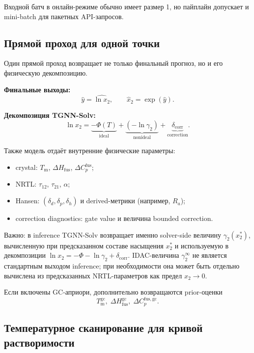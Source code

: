 \documentclass[11pt]{article}
\begin{document}
Входной батч в онлайн-режиме обычно имеет размер 1, но пайплайн допускает и mini-batch для пакетных API-запросов.

\subsection{Прямой проход для одной точки}

Один прямой проход возвращает не только финальный прогноз, но и его физическую декомпозицию.

\textbf{Финальные выходы:}
\begin{equation*}
\hat{y}=\widehat{\ln x_2}, \qquad \hat{x}_2=\exp(\hat{y}).
\end{equation*}

\textbf{Декомпозиция TGNN-Solv:}
\begin{equation*}
\ln x_2 = \underbrace{-\Phi(T)}_{\text{ideal}} +
\underbrace{(-\ln\gamma_2)}_{\text{nonideal}} +
\underbrace{\delta_{\text{corr}}}_{\text{correction}}.
\end{equation*}

Также модель отдаёт внутренние физические параметры:
\begin{itemize}
  \item crystal: $T_{\mathrm{m}}$, $\Delta H_{\mathrm{fus}}$, $\Delta C_p^{\mathrm{fus}}$;
  \item NRTL: $\tau_{12}$, $\tau_{21}$, $\alpha$;
  \item Hansen: $(\delta_d,\delta_p,\delta_h)$ и derived-метрики (например, $R_a$);
  \item correction diagnostics: gate value и величина bounded correction.
\end{itemize}

Важно: в inference TGNN-Solv возвращает именно solver-side величину $\gamma_2(x_2^{*})$, вычисленную при предсказанном составе насыщения $x_2^{*}$ и используемую в декомпозиции $\ln x_2 = -\Phi - \ln\gamma_2 + \delta_{\mathrm{corr}}$. IDAC-величина $\gamma_2^{\infty}$ не является стандартным выходом inference; при необходимости она может быть отдельно вычислена из предсказанных NRTL-параметров как предел $x_2 \to 0$.

Если включены GC-априори, дополнительно возвращаются prior-оценки
\begin{equation*}
T_{\mathrm{m}}^{\mathrm{gc}},\; \Delta H_{\mathrm{fus}}^{\mathrm{gc}},\; \Delta C_p^{\mathrm{fus,gc}}.
\end{equation*}

\subsection{Температурное сканирование для кривой растворимости}
\end{document}
